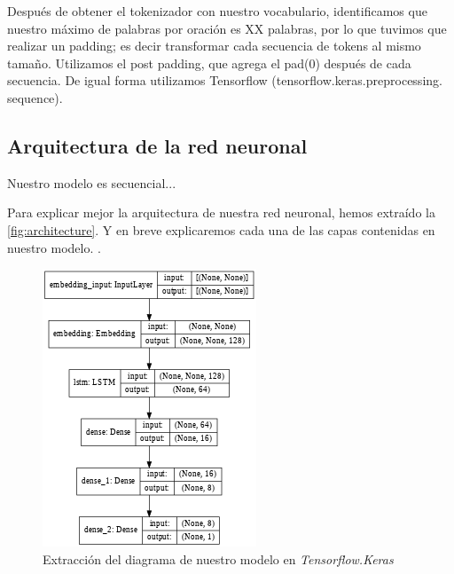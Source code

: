 \documentclass[sigconf, nonacm, spanish]{acmart}
\begin{document}
Después de obtener el tokenizador con nuestro vocabulario, identificamos que nuestro máximo de palabras por oración es XX palabras, por lo que tuvimos que realizar un padding; es decir transformar cada secuencia de tokens al mismo tamaño. Utilizamos el post padding, que agrega el pad(0) después de cada secuencia. De igual forma utilizamos Tensorflow (tensorflow.keras.preprocessing. sequence).

\subsection{Arquitectura de la red neuronal}

Nuestro modelo es secuencial...

Para explicar mejor la arquitectura de nuestra red neuronal,  hemos extraído la \autoref{fig:architecture}. Y en breve explicaremos cada una de las capas contenidas en nuestro modelo.
.


\begin{figure}
  \centering
  \includegraphics[width=\linewidth]{figures/arquitectura}
  \caption{Extracción del diagrama de nuestro modelo en \textit{Tensorflow.Keras}}
  \label{fig:architecture}
\end{figure}
\end{document}
